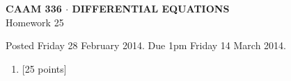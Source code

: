 \documentclass[10pt]{article}
\begin{document}
\vspace*{-5em}
\begin{center}
\large \textsf{\textbf{CAAM 336 $\cdot$ DIFFERENTIAL EQUATIONS}\\[0.5em]
Homework 25 }
\end{center}

Posted Friday 28 February 2014. Due 1pm Friday 14 March 2014.

\begin{enumerate}\addtocounter{enumi}{24}
\item {[25 points]}  
\end{enumerate}
\end{document}
